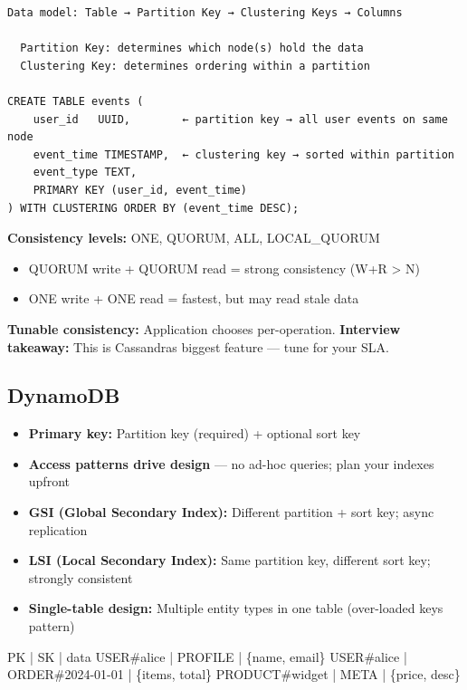 \documentclass[11pt]{article}
\providecommand{\tightlist}{\setlength{\itemsep}{1pt}\setlength{\parskip}{0pt}}
\newenvironment{Shaded}{\begin{snugshade}}{\end{snugshade}}
\newcommand{\CommentTok}[1]{\textcolor[rgb]{0.48,0.49,0.49}{#1}}
\newcommand{\NormalTok}[1]{\textcolor[rgb]{0.81,0.81,0.76}{#1}}
\newcommand{\OperatorTok}[1]{\textcolor[rgb]{0.81,0.81,0.76}{#1}}
\begin{document}
\setcodelang{}

\begin{verbatim}
Data model: Table → Partition Key → Clustering Keys → Columns

  Partition Key: determines which node(s) hold the data
  Clustering Key: determines ordering within a partition

CREATE TABLE events (
    user_id   UUID,        ← partition key → all user events on same node
    event_time TIMESTAMP,  ← clustering key → sorted within partition
    event_type TEXT,
    PRIMARY KEY (user_id, event_time)
) WITH CLUSTERING ORDER BY (event_time DESC);
\end{verbatim}

\textbf{Consistency levels:} ONE, QUORUM, ALL, LOCAL\_QUORUM

\begin{itemize}
\tightlist
\item
  QUORUM write + QUORUM read = strong consistency (W+R \textgreater{} N)
\item
  ONE write + ONE read = fastest, but may read stale data
\end{itemize}

\textbf{Tunable consistency:} Application chooses per-operation. \textbf{Interview takeaway:} This is Cassandra\textquotesingle s biggest feature --- tune for your SLA.

\subsection{DynamoDB}\label{dynamodb}

\begin{itemize}
\tightlist
\item
  \textbf{Primary key:} Partition key (required) + optional sort key
\item
  \textbf{Access patterns drive design} --- no ad-hoc queries; plan your indexes upfront
\item
  \textbf{GSI (Global Secondary Index):} Different partition + sort key; async replication
\item
  \textbf{LSI (Local Secondary Index):} Same partition key, different sort key; strongly consistent
\item
  \textbf{Single-table design:} Multiple entity types in one table (over-loaded keys pattern)
\end{itemize}


\begin{Shaded}
\begin{Highlighting}[]
\NormalTok{PK               }\OperatorTok{|}\NormalTok{ SK               }\OperatorTok{|}\NormalTok{ data}
\NormalTok{USER}\CommentTok{\#alice       | PROFILE          | \{name, email\}}
\NormalTok{USER}\CommentTok{\#alice       | ORDER\#2024{-}01{-}01 | \{items, total\}}
\NormalTok{PRODUCT}\CommentTok{\#widget   | META             | \{price, desc\}}
\end{Highlighting}
\end{Shaded}
\end{document}
